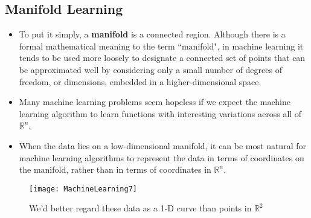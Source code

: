 \subsection{Manifold Learning}
    \begin{itemize}
        \item To put it simply, a \textbf{manifold} is a connected region. Although there is a formal mathematical meaning to the term ``manifold", in
        machine learning it tends to be used more loosely to designate a connected set of points that can be approximated well by considering only a small number of degrees of freedom, or dimensions, embedded in a higher-dimensional space.
        \item Many machine learning problems seem hopeless if we expect the machine learning algorithm to learn functions with interesting variations across all of $\mathbb R^n$.
        \item When the data lies on a low-dimensional manifold, it can be most natural for machine learning algorithms to represent the data in terms of coordinates on the manifold, rather than in terms of coordinates in $\mathbb R^n$.
    \end{itemize}
    \begin{figure} 
    \caption{We'd better regard these data as a 1-D curve than points in $\mathbb R^2$}
    \texttt{[image: MachineLearning7]}\label{7}
\end{figure}
